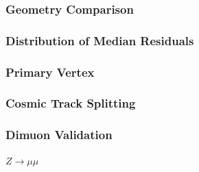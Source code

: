 \subsubsection{Geometry Comparison}


\subsubsection{Distribution of Median Residuals}


\subsubsection{Primary Vertex}


\subsubsection{Cosmic Track Splitting}


\subsubsection{Dimuon Validation}

$Z \rightarrow \mu\mu$

